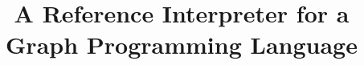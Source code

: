 \documentclass[]{llncs}
\begin{document}
\title{A Reference Interpreter for a Graph Programming Language}
\end{document}
